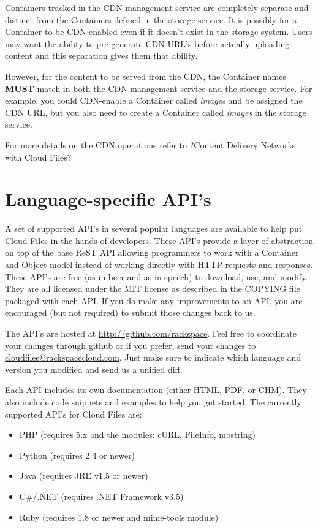 \documentclass[letterpaper,10pt,english]{manual}
\begin{document}
Containers tracked in the CDN management service are completely separate
and distinct from the Containers defined in the storage service.  It
is possibly for a Container to be CDN-enabled even if it doesn't exist
in the storage system.  Users may want the ability to pre-generate
CDN URL's before actually uploading content and this separation gives
them that ability.

However, for the content to be served from the CDN, the Container names
\textbf{MUST} match in both the CDN management service and the storage service.
For example, you could CDN-enable a Container called \emph{images} and be
assigned the CDN URL, but you also need to create a Container called
\emph{images} in the storage service.

For more details on the CDN operations refer to ?Content Delivery Networks
with Cloud Files?


\chapter{Language-specific API's}

A set of supported API's in several popular languages are available to
help put Cloud Files in the hands of developers.  These API's provide a
layer of abstraction on top of the base ReST API allowing programmers to
work with a Container and Object model instead of working directly with
HTTP requests and responses.   These API's are free (as in beer and as in
speech) to download, use, and modify.  They are all licensed under the
MIT license as described in the COPYING file packaged with each API.  If
you do make any improvements to an API, you are encouraged (but not
required) to submit those changes back to us.

The API's are hosted at \href{http://github.com/rackspace}{http://github.com/rackspace}.  Feel free to
coordinate your changes through github or if you prefer, send
your changes to \href{mailto:cloudfiles@rackspacecloud.com}{cloudfiles@rackspacecloud.com}.  Just make sure to
indicate which language and version you modified and send us a unified
diff.

Each API includes its own documentation (either HTML, PDF, or CHM).
They also include code snippets and examples to help you get started.
The currently supported API's for Cloud Files are:
\begin{itemize}
\item {} 
PHP (requires 5.x and the modules: cURL, FileInfo, mbstring)

\item {} 
Python (requires 2.4 or newer)

\item {} 
Java (requires JRE v1.5 or newer)

\item {} 
C\#/.NET (requires .NET Framework v3.5)

\item {} 
Ruby (requires 1.8 or newer and mime-tools module)

\end{itemize}
\end{document}
